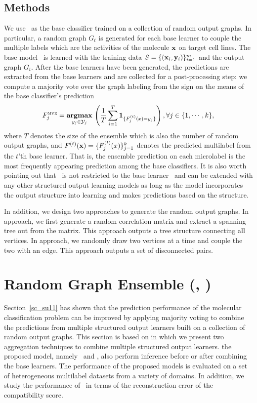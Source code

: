 {%
%
\subsection{Methods}

We use \mmcrf\ as the base classifier trained on a collection of random output graphs.
In particular, a random graph $G_t$ is generated for each base learner to couple the multiple labels which are the activities of the molecule $\mathbf {x}$ on target cell lines.
The base model \mmcrf\ is learned with the training data $S=\{(\mathbf {x}_i,\mathbf {y}_i)\}_{i=1}^{m}$ and the output graph $G_t$.
After the base learners have been generated, the predictions are extracted from the base learners and are collected for a post-processing step: we compute a majority vote over the graph labeling from the sign on the means of the base classifier's prediction
\begin{align*}
	F_j^{\text{{\sc mve}}}=\underset{y_j\in\mathcal{Y}_j}{\textbf{argmax}}\,\left(\frac{1}{T}\sum_{i=1}^{T}\mathbf{1}_{\{F_j^{(t)}(x)=y_j\}}\right), \forall j\in\{1,\cdots,k\},
\end{align*}
where $T$ denotes the size of the ensemble which is also the number of random output graphs, and $F^{(t)}(\mathbf {x})=\{F^{(t)}_j(x)\}_{j=1}^{k}$ denotes the predicted multilabel from the $t$'th base learner.
That is, the ensemble prediction on each microlabel is the most frequently appearing prediction among the base classifiers.
It is also worth pointing out that \mve\ is not restricted to the base learner \mmcrf\ and can be extended with any other structured output learning models as long as the model incorporates the output structure into learning and makes predictions based on the structure.

In addition, we design two approaches to generate the random output graphs.
In  approach, we first generate a random correlation matrix and extract a spanning tree out from the matrix.
This approach outputs a tree structure connecting all vertices.
In  approach, we randomly draw two vertices at a time and couple the two with an edge.
This approach outputs a set of disconnected pairs.



%
%
\section{Random Graph Ensemble (\amm, \mam)} \label{sc_su14b}

Section~\ref{sc_su11} has shown that the prediction performance of the molecular classification problem can be improved by applying majority voting to combine the predictions from multiple structured output learners built on a collection of random output graphs.
This section is based on  in which we present two aggregation techniques to combine multiple structured output learners. 
the proposed model, namely \amm\ and \mam, also perform inference before or after combining the base learners.
The performance of the proposed models is evaluated on a set of heterogeneous multilabel datasets from a variety of domains.
In addition, we study the performance of \mam\ in terms of the reconstruction error of the compatibility score.



}
